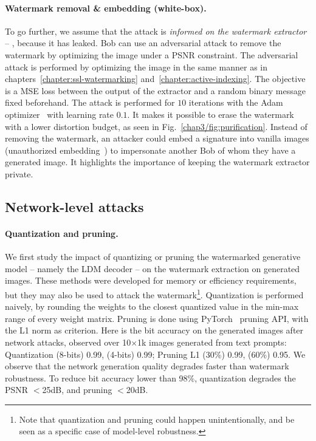 \paragraph{Watermark removal \& embedding (white-box).}
To go further, we assume that the attack is \emph{informed on the watermark extractor} -- \eg, because it has leaked.
Bob can use an adversarial attack to remove the watermark by optimizing the image under a PSNR constraint.
The adversarial attack is performed by optimizing the image in the same manner as in chapters~\ref{chapter:ssl-watermarking} and~\ref{chapter:active-indexing}.
The objective is a MSE loss between the output of the extractor and a random binary message fixed beforehand. 
The attack is performed for $10$ iterations with the Adam optimizer~\citep{kingma2014adam} with learning rate $0.1$.
It makes it possible to erase the watermark with a lower distortion budget, as seen in Fig.~\ref{chap3/fig:purification}.
Instead of removing the watermark, an attacker could embed a signature into vanilla images (unauthorized embedding~\citep{cox2007digital}) to impersonate another Bob of whom they have a generated image. 
It highlights the importance of keeping the watermark extractor private.





\subsection{Network-level attacks}\label{chap3/subsec:network-level-attacks}

\paragraph{Quantization and pruning.}
We first study the impact of quantizing or pruning the watermarked generative model -- namely the LDM decoder -- on the watermark extraction on generated images.
These methods were developed for memory or efficiency requirements, but they may also be used to attack the watermark\footnote{Note that quantization and pruning could happen unintentionally, and be seen as a specific case of model-level robustness.}.
Quantization is performed naively, by rounding the weights to the closest quantized value in the min-max range of every weight matrix.
Pruning is done using PyTorch~\citep{paszke2019pytorch} pruning API, with the L1 norm as criterion.
Here is the bit accuracy on the generated images after network attacks, observed over 10$\times$1k images generated from text prompts: Quantization (8-bits) 0.99, (4-bits) 0.99; Pruning L1 (30\%) 0.99, (60\%) 0.95.
We observe that the network generation quality degrades faster than watermark robustness. 
To reduce bit accuracy lower than 98\%, quantization degrades the PSNR $<$25dB, and pruning $<$20dB.


